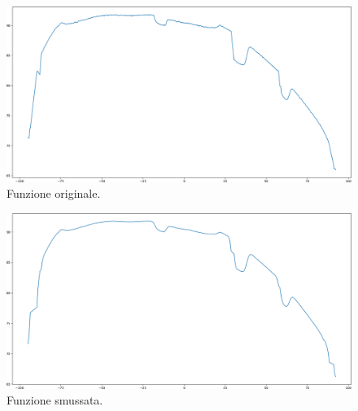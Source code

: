 \begin{figure}[H]
	\centering
	\includegraphics[width=0.9\columnwidth]{./pictures/batt_2_analisi_3.png}
	\caption{Funzione originale.}\label{fig:batt_2_analisi_3}
\end{figure}

\begin{figure}[H]
	\centering
	\includegraphics[width=0.9\columnwidth]{./pictures/batt_2_analisi_4.png}
	\caption{Funzione smussata.}\label{fig:batt_2_analisi_4}
\end{figure}

